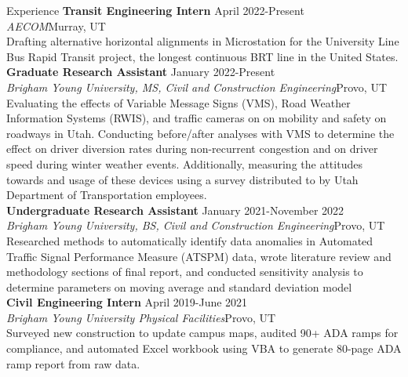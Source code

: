 \documentclass{resume} %
\begin{document}
\begin{rSection}{Experience}
{\bf Transit Engineering Intern} \hfill {April 2022-Present} \\
{\em AECOM}\hfill {Murray, UT} \\
Drafting alternative horizontal alignments in Microstation for the University Line Bus Rapid Transit project, the longest continuous BRT line in the United States. \\

{\bf Graduate Research Assistant} \hfill {January 2022-Present} \\
{\em Brigham Young University, MS, Civil and Construction Engineering}\hfill {Provo, UT} \\
Evaluating the effects of Variable Message Signs (VMS), Road Weather Information Systems (RWIS), and traffic cameras on on mobility and safety on roadways in Utah. Conducting before/after analyses with VMS to determine the effect on driver diversion rates during non-recurrent congestion and on driver speed during winter weather events. Additionally, measuring the attitudes towards and usage of these devices using a survey distributed to by Utah Department of Transportation employees. \\

{\bf Undergraduate Research Assistant} \hfill {January 2021-November 2022} \\
{\em Brigham Young University, BS, Civil and Construction Engineering}\hfill {Provo, UT} \\
Researched methods to automatically identify data anomalies in Automated Traffic Signal Performance Measure (ATSPM) data, wrote literature review and methodology sections of final report, and conducted sensitivity analysis to determine parameters on moving average and standard deviation model \\

{\bf Civil Engineering Intern} \hfill {April 2019-June 2021} \\
{\em Brigham Young University Physical Facilities}\hfill {Provo, UT} \\
Surveyed new construction to update campus maps, audited 90+ ADA ramps for compliance, and automated Excel workbook using VBA to generate 80-page ADA ramp report from raw data.

\end{rSection}


\end{document}
